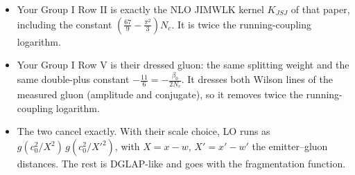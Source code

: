 \documentclass[10pt]{article}
\numberwithin{equation}{section}
\begin{document}
\begin{enumerate}
\begin{itemize}
\item Your Group I Row II is exactly the NLO JIMWLK kernel $K_{JSJ}$ of that paper, including the constant $(\frac{67}{9}-\frac{\pi^2}{3})N_c$. It is twice the running-coupling logarithm.
\item Your Group I Row V is their dressed gluon: the same splitting weight and the same double-plus constant $-\frac{11}{6}=-\frac{\beta_0}{2N_c}$. It dresses both Wilson lines of the measured gluon (amplitude and conjugate), so it removes twice the running-coupling logarithm.
\item The two cancel exactly. With their scale choice, LO runs as $g(c_0^2/X^2)\,g(c_0^2/X'^2)$, with $X=x-w$, $X'=x'-w'$ the emitter--gluon distances. The rest is DGLAP-like and goes with the fragmentation function.
\end{itemize}
\end{enumerate}
\end{document}
